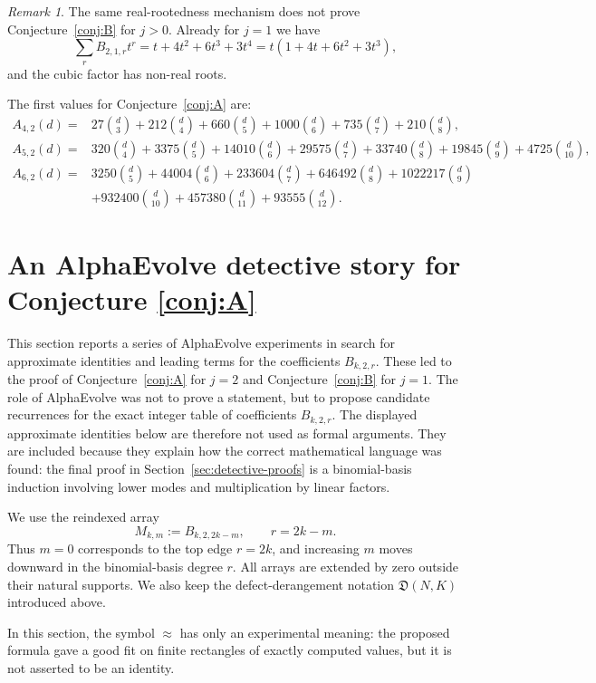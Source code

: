 \documentclass[11pt]{amsart}
\numberwithin{equation}{section}
\theoremstyle{remark}
\newtheorem{remark}[theorem]{Remark}
\newcommand{\Dder}{\mathfrak D}
\begin{document}
\begin{remark}
The same real-rootedness mechanism does not prove Conjecture~\ref{conj:B} for $j>0$.  Already for $j=1$ we have
\[
  \sum_rB_{2,1,r}t^r=t+4t^2+6t^3+3t^4=t(1+4t+6t^2+3t^3),
\]
and the cubic factor has non-real roots.
\end{remark}

The first values for Conjecture~\ref{conj:A} are:
\begin{align*}
A_{4,2}(d)={}&27\binom d3+212\binom d4+660\binom d5+1000\binom d6+735\binom d7+210\binom d8,\\
A_{5,2}(d)={}&320\binom d4+3375\binom d5+14010\binom d6+29575\binom d7
+33740\binom d8+19845\binom d9+4725\binom d{10},\\
A_{6,2}(d)={}&3250\binom d5+44004\binom d6+233604\binom d7+646492\binom d8
+1022217\binom d9\\
&+932400\binom d{10}+457380\binom d{11}+93555\binom d{12}.
\end{align*}



\section{An AlphaEvolve detective story for Conjecture \ref{conj:A}}
\label{sec:detective}

This section reports a series of AlphaEvolve experiments in search for approximate identities and leading terms for the coefficients $B_{k,2,r}$. These led to the proof of
Conjecture~\ref{conj:A} for $j=2$ and Conjecture~\ref{conj:B} for $j=1$. The role of AlphaEvolve was not to prove a
statement, but to propose candidate recurrences for the exact integer table
of coefficients $B_{k,2,r}$.  The displayed approximate identities below
are therefore not used as formal arguments.  They are included because they
explain how the correct mathematical language was found: the final proof in
Section~\ref{sec:detective-proofs} is a binomial-basis induction involving
lower modes and multiplication by linear factors.

We use the reindexed array
\[
  M_{k,m}:=B_{k,2,2k-m},\qquad r=2k-m.
\]
Thus $m=0$ corresponds to the top edge $r=2k$, and increasing $m$
moves downward in the binomial-basis degree $r$.  All arrays are extended
by zero outside their natural supports.  We also keep the defect-derangement
notation $\Dder(N,K)$ introduced above.

In this section, the symbol $\approx$ has only an experimental meaning:
the proposed formula gave a good fit on finite rectangles of exactly
computed values, but it is not asserted to be an identity.
\end{document}
